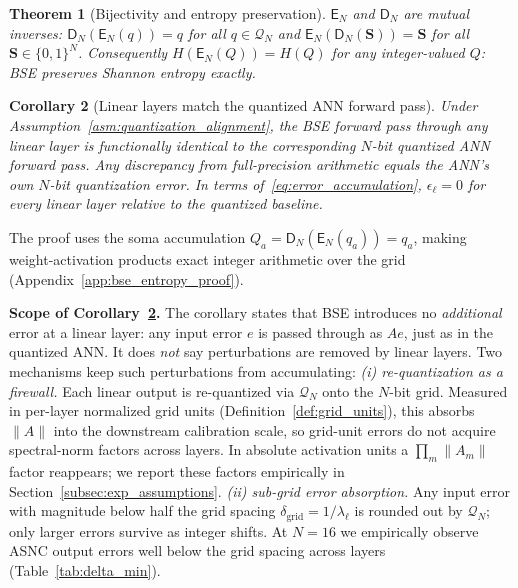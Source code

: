 \documentclass{article}
\theoremstyle{plain}
\newtheorem{theorem}{Theorem}[section]
\newtheorem{corollary}[theorem]{Corollary}
\theoremstyle{definition}
\theoremstyle{remark}
\begin{document}
\begin{theorem}[Bijectivity and entropy preservation]
\label{thm:bse_main}
$\mathsf{E}_N$ and $\mathsf{D}_N$ are mutual inverses:
$\mathsf{D}_N(\mathsf{E}_N(q))=q$ for all $q\in\mathcal{Q}_N$ and
$\mathsf{E}_N(\mathsf{D}_N(\mathbf{S}))=\mathbf{S}$ for all
$\mathbf{S}\in\{0,1\}^N$. Consequently $H(\mathsf{E}_N(Q))=H(Q)$ for any
integer-valued $Q$: BSE preserves Shannon entropy exactly.
\end{theorem}

\begin{corollary}[Linear layers match the quantized ANN forward pass]
\label{cor:no_diffusion_main}
Under Assumption~\ref{asm:quantization_alignment}, the BSE forward pass
through any linear layer is functionally identical to the corresponding
$N$-bit quantized ANN forward pass. Any discrepancy from full-precision
arithmetic equals the ANN's own $N$-bit quantization error. In terms
of~\eqref{eq:error_accumulation}, $\epsilon_\ell=0$ for every linear layer
relative to the quantized baseline.
\end{corollary}
The proof uses the soma accumulation
$Q_a=\mathsf{D}_N(\mathsf{E}_N(q_a))=q_a$, making weight-activation products
exact integer arithmetic over the grid
(Appendix~\ref{app:bse_entropy_proof}).

\noindent\textbf{Scope of Corollary~\ref{cor:no_diffusion_main}.}
The corollary states that BSE introduces no \emph{additional} error at a
linear layer: any input error $e$ is passed through as $A e$, just as in
the quantized ANN. It does \emph{not} say perturbations are removed by
linear layers. Two mechanisms keep such perturbations from accumulating:
\emph{(i) re-quantization as a firewall.} Each linear output is
re-quantized via $\mathcal{Q}_N$ onto the $N$-bit grid. Measured in per-layer
normalized grid units (Definition~\ref{def:grid_units}), this absorbs
$\|A\|$ into the downstream calibration scale, so grid-unit errors do not
acquire spectral-norm factors across layers. In absolute activation units a
$\prod_m\|A_m\|$ factor reappears; we report these factors empirically in
Section~\ref{subsec:exp_assumptions}.
\emph{(ii) sub-grid error absorption.} Any input error with magnitude below
half the grid spacing $\delta_{\mathrm{grid}}=1/\lambda_\ell$ is rounded out
by $\mathcal{Q}_N$; only larger errors survive as integer shifts. At $N=16$
we empirically observe ASNC output errors well below the grid spacing
across layers (Table~\ref{tab:delta_min}).


\end{document}
